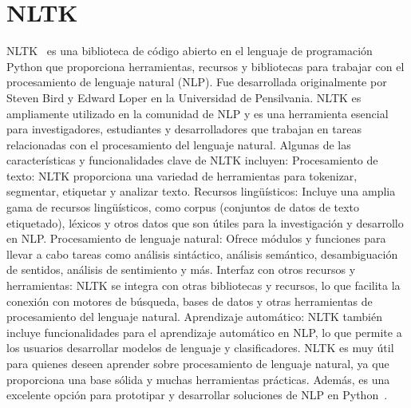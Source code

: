 \section{NLTK}
NLTK~\cite{NLTK1} es una biblioteca de código abierto en el lenguaje de programación Python que proporciona herramientas, recursos y bibliotecas para trabajar con el procesamiento de lenguaje natural (NLP). Fue desarrollada originalmente por Steven Bird y Edward Loper en la Universidad de Pensilvania.
NLTK es ampliamente utilizado en la comunidad de NLP y es una herramienta esencial para investigadores, estudiantes y desarrolladores que trabajan en tareas relacionadas con el procesamiento del lenguaje natural. Algunas de las características y funcionalidades clave de NLTK incluyen:
Procesamiento de texto: NLTK proporciona una variedad de herramientas para tokenizar, segmentar, etiquetar y analizar texto.
Recursos lingüísticos: Incluye una amplia gama de recursos lingüísticos, como corpus (conjuntos de datos de texto etiquetado), léxicos y otros datos que son útiles para la investigación y desarrollo en NLP.
Procesamiento de lenguaje natural: Ofrece módulos y funciones para llevar a cabo tareas como análisis sintáctico, análisis semántico, desambiguación de sentidos, análisis de sentimiento y más.
Interfaz con otros recursos y herramientas: NLTK se integra con otras bibliotecas y recursos, lo que facilita la conexión con motores de búsqueda, bases de datos y otras herramientas de procesamiento del lenguaje natural.
Aprendizaje automático: NLTK también incluye funcionalidades para el aprendizaje automático en NLP, lo que permite a los usuarios desarrollar modelos de lenguaje y clasificadores.
NLTK es muy útil para quienes deseen aprender sobre procesamiento de lenguaje natural, ya que proporciona una base sólida y muchas herramientas prácticas. Además, es una excelente opción para prototipar y desarrollar soluciones de NLP en Python~\cite{NLTK2}.



